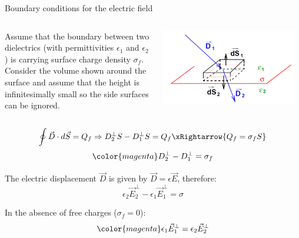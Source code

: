 \begin{frame}{Boundary conditions for the electric field}

\begin{columns}
  \begin{column}{0.50\textwidth}
   {\small
     Assume that the boundary between two dielectrics (with
     permittivities $\epsilon_1$ and  $\epsilon_2$)
     is carrying surface charge density $\sigma_f$.\\
     Consider the volume shown around the surface and
     assume that the height is infinitesimally small so the side
     surfaces can be ignored.
  }
  \end{column}
  \begin{column}{0.50\textwidth}
    \begin{center}
      \includegraphics[width=0.95\textwidth]{./images/schematics/boundary_conditions_electric_field_1.png}\\
    \end{center}
  \end{column}
\end{columns}

\begin{equation*}
  \oint \vec{D} \cdot d\vec{S} = Q_f \Rightarrow
       D_2^{\perp} S - D_1^{\perp} S = Q_f \xRightarrow{Q_f = \sigma_f S}
\end{equation*}
\begin{equation*}
         {\color{magenta}D_2^{\perp} - D_1^{\perp} = \sigma_f}
\end{equation*}

The electric displacement $\vec{D}$ is given by
$\displaystyle \vec{D} = \epsilon \vec{E}$,
therefore:
\begin{equation*}
   \epsilon_2 \vec{E}_2^{\perp} - \epsilon_1 \vec{E}_1^{\perp} = \sigma
\end{equation*}

In the absence of free charges ($\sigma_f=0$):
\begin{equation*}
   {\color{magenta} \epsilon_1 \vec{E}_1^{\perp} = \epsilon_2 \vec{E}_2^{\perp} }
\end{equation*}

\end{frame}


